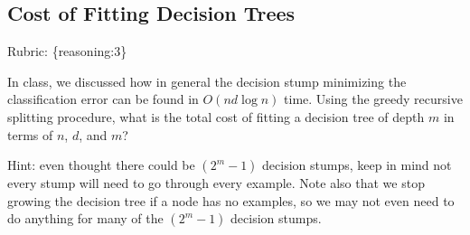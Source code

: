 \documentclass{article}
\def\rubric#1{\gre{Rubric: \{#1\}}}{}
\def\blu#1{{\color{blu}#1}}
\def\gre#1{{\color{gre}#1}}
\begin{document}
\subsection{Cost of Fitting Decision Trees}
\rubric{reasoning:3}

In class, we discussed how in general the decision stump minimizing the classification error can be found in $O(nd\log n)$ time.
Using the greedy recursive splitting procedure, \blu{what is the total cost of fitting a decision tree of depth $m$ in terms of $n$, $d$, and $m$?}

Hint: even thought there could be $(2^m-1)$ decision stumps, keep in mind not every stump will need to go through every example. Note also that we stop growing the decision tree if a node has no examples, so we may not even need to do anything for many of the $(2^m-1)$ decision stumps.
\end{document}
